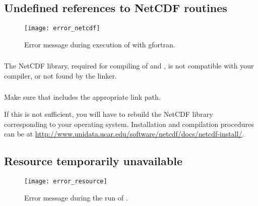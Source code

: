 \subsection{Undefined references to NetCDF routines\label{sec:error_netcdf}}

\begin{figure}[htpb]
\centering
\texttt{[image: error\_netcdf]}
\caption{Error message during execution of  with gfortran\label{fig:error_netcdf}.}
\end{figure}

\subsubsection{\question}

The NetCDF library, required for compiling of  and , is not compatible with your compiler, or not found by the linker.

\subsubsection{\answer}

Make sure that  includes the appropriate link path.

If this is not sufficient, you will have to rebuild the NetCDF library corresponding to your operating system. Installation and compilation procedures can be at \url{http://www.unidata.ucar.edu/software/netcdf/docs/netcdf-install/}.



\subsection[Resource temporarily unavailable]{Resource temporarily unavailable\label{sec:error_resource}}


\begin{figure}[htpb]
\centering
\texttt{[image: error\_resource]}
\caption{Error message during the run of \label{fig:error_resource}.}
\end{figure}

